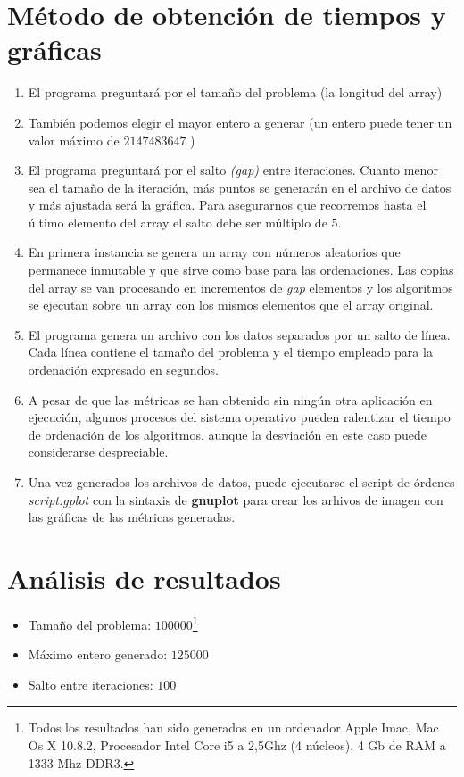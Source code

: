 \section{Método de obtención de tiempos y gráficas}
	\begin{enumerate}
		\item El programa preguntará por el tamaño del problema (la longitud del array)
		\item También podemos elegir el mayor entero a generar (un entero puede tener un valor 				máximo de $2147483647$ )
		\item El programa preguntará por el salto \emph{(gap)} entre iteraciones.  Cuanto menor sea el tamaño de la iteración, más puntos se generarán en el archivo de datos y más ajustada será la gráfica.  Para asegurarnos que 					recorremos hasta el último elemento del array el salto debe ser múltiplo de $5$.
		\item En primera instancia se genera un array con números aleatorios que permanece inmutable y que sirve como base 					para las ordenaciones. Las copias del array se van procesando en incrementos de \textit{gap} elementos y los algoritmos se ejecutan sobre un array con los mismos elementos que el array original.
		\item El programa genera un archivo con los datos separados por un salto de línea.  Cada 					línea contiene el tamaño del problema y el tiempo empleado para la ordenación expresado 			en segundos.
		\item A pesar de que las métricas se han obtenido sin ningún otra aplicación en ejecución, algunos procesos del sistema operativo pueden ralentizar el tiempo de ordenación de los algoritmos, aunque la desviación en este caso puede considerarse despreciable.
		\item Una vez generados los archivos de datos, puede ejecutarse el script de órdenes \textit{script.gplot} con la sintaxis de 				\textbf{gnuplot} para crear los arhivos de imagen con las gráficas de las métricas 					generadas.
	\end{enumerate}


\section{Análisis de resultados}
\begin{itemize}
\item Tamaño del problema: $100000$\footnote{Todos los resultados han sido generados en un ordenador Apple Imac, Mac Os X 10.8.2, Procesador Intel Core i5 a 2,5Ghz (4 núcleos), 4 Gb de RAM a 1333 Mhz DDR3.}
\item Máximo entero generado: $125000$
\item Salto entre iteraciones: $100$
\end{itemize}
\newpage
